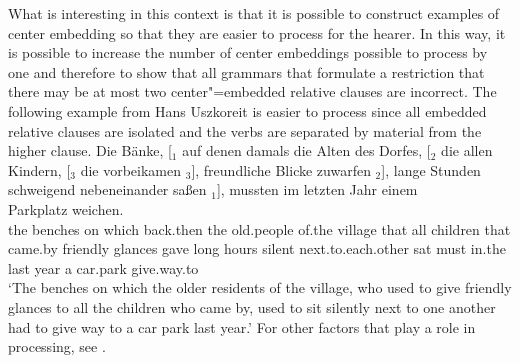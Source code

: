 \noindent
What is interesting in this context is that it is possible to construct examples of center embedding so that they are easier to process
for the hearer. In this way, it is possible to increase the number of center embeddings possible to
process by one and therefore to show that all grammars that formulate a restriction that there may
be at most two center"=embedded relative clauses are incorrect.
The following example from Hans Uszkoreit is easier to process since all embedded relative clauses are isolated and the verbs
are separated by material from the higher clause.
\ea
\gll Die Bänke, [$_1$ auf denen damals die Alten des Dorfes, [$_2$ die allen Kindern, [$_3$ die vorbeikamen $_3$], freundliche Blicke zuwarfen $_2$], 
lange Stunden schweigend nebeneinander saßen $_1$], mussten im letzten Jahr einem~~~~~~~ Parkplatz weichen.\\
the benches {} on which back.then the old.people of.the village {} that all children {} that came.by {} friendly glances gave {}
long hours silent next.to.each.other sat {} must in.the last year a car.park give.way.to\\
\glt `The benches on which the older residents of the village, who used to give friendly glances to all the children who came by, used to sit silently next to one 
another had to give way to a car park last year.'
\z
For other factors that play a role in processing, see .


